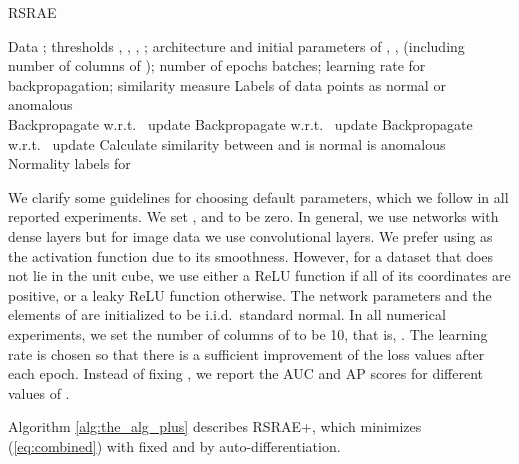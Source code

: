 \documentclass{article} \usepackage{iclr2020_conference,times}
\def\eqref#1{(\ref{#1})}
\begin{document}
 \begin{algorithm}[h] 
 \caption{RSRAE 
 }
 \label{alg:the_alg}
 \begin{algorithmic}[1]
 \renewcommand{\algorithmicrequire}{\textbf{Input:}}
 \renewcommand{\algorithmicensure}{\textbf{Output:}}
 \REQUIRE Data ; thresholds , , , ;  architecture and initial parameters of , ,  (including number of columns of ); number of epochs  batches; learning rate for backpropagation; similarity measure
 \ENSURE  Labels of data points as normal or anomalous \\
  \IF {}
  \STATE Backpropagate  w.r.t.~  update 
  \ENDIF
  \IF{}
  \STATE Backpropagate  w.r.t.~
   update 
  \ENDIF
  \IF{}
  \STATE Backpropagate  w.r.t.~ 
  update 
  \ENDIF
  \ENDFOR
  \ENDFOR
  \FOR{}
  \STATE Calculate similarity between
   and 
  \STATE  is normal
  \ELSE
 \STATE  is anomalous
 \ENDIF
 \ENDFOR
 \RETURN Normality labels for 
 \end{algorithmic} 
 \end{algorithm}

We clarify some guidelines for choosing default parameters, which we follow in all reported experiments. We set ,  and  to be zero. In general, we use networks with dense layers but for image data we use convolutional layers. We prefer using  as the activation function due to its smoothness. However, for a dataset that does not lie in the unit cube, we use either a ReLU function if all of its coordinates are positive, or a leaky ReLU function otherwise. The network parameters and the elements of  are initialized to be i.i.d.~standard normal. In all numerical experiments, we set the number of columns of  to be 10, that is, . The learning rate is chosen so that there is a sufficient improvement of the loss values after each epoch. Instead of fixing , we report the AUC and AP scores for different values of .

Algorithm \ref{alg:the_alg_plus} describes RSRAE+, which minimizes \eqref{eq:combined} with fixed  and  by auto-differentiation.
\end{document}
